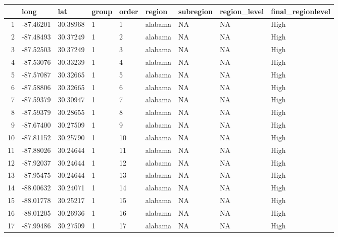 \documentclass[11pt]{article}
\begin{document}
    \begin{tabular}{r|llllllll}
  & long & lat & group & order & region & subregion & region\_level & final\_regionlevel\\
\hline
	1 & -87.46201 & 30.38968  & 1         &  1        & alabama   & NA        & NA        & High     \\
	2 & -87.48493 & 30.37249  & 1         &  2        & alabama   & NA        & NA        & High     \\
	3 & -87.52503 & 30.37249  & 1         &  3        & alabama   & NA        & NA        & High     \\
	4 & -87.53076 & 30.33239  & 1         &  4        & alabama   & NA        & NA        & High     \\
	5 & -87.57087 & 30.32665  & 1         &  5        & alabama   & NA        & NA        & High     \\
	6 & -87.58806 & 30.32665  & 1         &  6        & alabama   & NA        & NA        & High     \\
	7 & -87.59379 & 30.30947  & 1         &  7        & alabama   & NA        & NA        & High     \\
	8 & -87.59379 & 30.28655  & 1         &  8        & alabama   & NA        & NA        & High     \\
	9 & -87.67400 & 30.27509  & 1         &  9        & alabama   & NA        & NA        & High     \\
	10 & -87.81152 & 30.25790  & 1         & 10        & alabama   & NA        & NA        & High     \\
	11 & -87.88026 & 30.24644  & 1         & 11        & alabama   & NA        & NA        & High     \\
	12 & -87.92037 & 30.24644  & 1         & 12        & alabama   & NA        & NA        & High     \\
	13 & -87.95475 & 30.24644  & 1         & 13        & alabama   & NA        & NA        & High     \\
	14 & -88.00632 & 30.24071  & 1         & 14        & alabama   & NA        & NA        & High     \\
	15 & -88.01778 & 30.25217  & 1         & 15        & alabama   & NA        & NA        & High     \\
	16 & -88.01205 & 30.26936  & 1         & 16        & alabama   & NA        & NA        & High     \\
	17 & -87.99486 & 30.27509  & 1         & 17        & alabama   & NA        & NA        & High     \\

\end{tabular}
\end{document}
